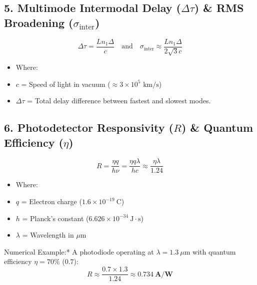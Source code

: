 \subsection{5. Multimode Intermodal Delay ($\Delta\tau$) \& RMS Broadening ($\sigma_{\text{inter}}$)}
\[ \Delta\tau = \frac{L n_1 \Delta}{c} \quad \text{and} \quad \sigma_{\text{inter}} \approx \frac{L n_1 \Delta}{2\sqrt{3}c} \]
\begin{itemize}
  \item   Where:
  \item   $c$ = Speed of light in vacuum ($\approx 3 \times 10^5\text{ km/s}$)
  \item   $\Delta\tau$ = Total delay difference between fastest and slowest modes.
\end{itemize}

\subsection{6. Photodetector Responsivity ($R$) \& Quantum Efficiency ($\eta$)}
\[ R = \frac{\eta q}{h \nu} = \frac{\eta q \lambda}{h c} \approx \frac{\eta \lambda}{1.24} \]
\begin{itemize}
  \item   Where:
  \item   $q$ = Electron charge ($1.6 \times 10^{-19}\ \text{C}$)
  \item   $h$ = Planck's constant ($6.626 \times 10^{-34}\ \text{J}\cdot\text{s}$)
  \item   $\lambda$ = Wavelength in $\mu\text{m}$
\end{itemize}
\textit{   }Numerical Example:* A photodiode operating at $\lambda = 1.3\ \mu\text{m}$ with quantum efficiency $\eta = 70\%$ ($0.7$):
    \[ R \approx \frac{0.7 \times 1.3}{1.24} \approx \mathbf{0.734\ \text{A/W}} \]

